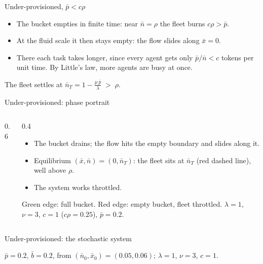 \documentclass[aspectratio=169]{beamer}
\newenvironment*{myitem}[1][1.5em]{\begin{itemize}\setlength{\itemsep}{#1}}{\end{itemize}}
\begin{document}
\begin{frame}{Under-provisioned, $\bar p<c\rho$}

	\begin{myitem}[1.2em]
		\item The bucket \alert{empties in finite time}: near $\bar n=\rho$ the fleet burns $c\rho>\bar p$.
		\item At the fluid scale it then \alert{stays empty}: the flow slides along $\bar x=0$.
		\item There each task takes longer, since every agent gets only $\bar p/\bar n<c$ tokens per unit time. By \alert{Little's law}, more agents are busy at once.
	\end{myitem}

	\pause
	\begin{block}{}
		\begin{center}
		The fleet settles at $\displaystyle \bar n_T = 1 - \frac{\mu\,\bar p}{\lambda} \;>\; \rho$.
		\end{center}
	\end{block}
\end{frame}

\begin{frame}{Under-provisioned: phase portrait}

	\begin{columns}
		\begin{column}{0.6\textwidth}
			\begin{center}
			
			\end{center}
		\end{column}
		\begin{column}{0.4\textwidth}
			\begin{myitem}[1em]
				\item The bucket drains; the flow hits the empty boundary and \alert{slides} along it.
				\item Equilibrium $(\bar x,\bar n)=(0,\bar n_T)$: the fleet sits at $\bar n_T$ (red dashed line), well \alert{above} $\rho$.
				\pause
				\item The system works \alert{throttled}.
			\end{myitem}
			\vfill
			{\footnotesize Green edge: full bucket. Red edge: empty bucket, fleet throttled. $\lambda=1$, $\nu=3$, $c=1$ ($c\rho=0.25$), $\bar p=0.2$.}
		\end{column}
	\end{columns}
\end{frame}

\begin{frame}{Under-provisioned: the stochastic system}

	\begin{center}
		
	\end{center}

	\vfill
	{\footnotesize $\bar p=0.2$, $\bar b=0.2$, from $(\bar n_0,\bar x_0)=(0.05,0.06)$; $\lambda=1$, $\nu=3$, $c=1$.}
\end{frame}
\end{document}
